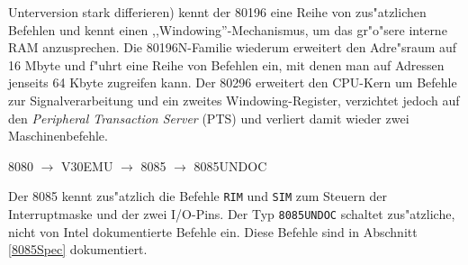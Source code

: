 \documentclass[12pt,a4paper,twoside]{report}
\newcommand{\tty}[1]{{\tt #1}}
\begin{document}
Unterversion stark differieren) kennt der 80196 eine Reihe von
zus"atzlichen Befehlen und kennt einen ,,Windowing''-Mechanismus, um
das gr"o"sere interne RAM anzusprechen.  Die 80196N-Familie wiederum
erweitert den Adre"sraum auf 16 Mbyte und f"uhrt eine Reihe von
Befehlen ein, mit denen man auf Adressen jenseits 64 Kbyte zugreifen
kann.  Der 80296 erweitert den CPU-Kern um Befehle zur Signalverarbeitung
und ein zweites Windowing-Register, verzichtet jedoch auf den {\em
Peripheral Transaction Server} (PTS) und verliert damit wieder zwei
Maschinenbefehle.
\begin{cpulist}
   8080 $\rightarrow$ V30EMU $\rightarrow$ 8085 $\rightarrow$ 8085UNDOC
\end{cpulist}
Der 8085 kennt zus"atzlich die Befehle \tty{RIM} und \tty{SIM} zum Steuern der
Interruptmaske und der zwei I/O-Pins.  Der Typ {\tt 8085UNDOC} schaltet
zus"atzliche, nicht von Intel dokumentierte Befehle ein.  Diese Befehle
sind in Abschnitt \ref{8085Spec} dokumentiert.
\end{document}

